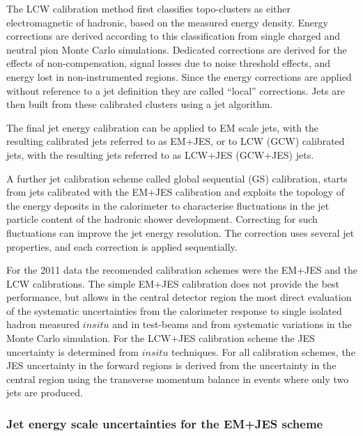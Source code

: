 \begin{itemize}
The LCW calibration method first classifies topo-clusters as either electromagnetic of hadronic, based on the measured energy density. Energy corrections are derived according to this classification from single charged and neutral pion Monte Carlo simulations. Dedicated corrections are derived for the effects of non-compensation, signal losses due to noise threshold effects, and energy lost in non-instrumented regions. Since the energy corrections are applied without reference to a jet definition they are called ``local'' corrections. Jets are then built from these calibrated clusters using a jet algorithm.  

The final jet energy calibration can be applied to EM scale jets, with the resulting calibrated jets referred to as EM+JES, or to LCW (GCW) calibrated jets, with the resulting jets referred to as LCW+JES (GCW+JES) jets.

A further jet calibration scheme called global sequential (GS) calibration, starts from jets calibrated with the EM+JES calibration and exploits the topology of the energy deposits in the calorimeter to characterise fluctuations in the jet particle content of the hadronic shower development.  Correcting for such fluctuations can improve the jet energy resolution. The correction uses several jet properties, and each correction is applied sequentially.


For the 2011 data the recomended calibration schemes were the EM+JES and the LCW calibrations. The simple EM+JES calibration does not provide the best performance, but allows in the central detector region the most direct evaluation of the systematic uncertainties from the calorimeter response to single isolated hadron measured $in situ$ and in test-beams and from systematic variations in the Monte Carlo simulation.  For the LCW+JES calibration scheme the JES uncertainty is determined from $in situ$ techniques. For all calibration schemes, the JES uncertainty in the forward regions is derived from the uncertainty in the central region using the transverse momentum balance in events where only two jets are produced. 



\subsubsection{Jet energy scale uncertainties for the EM+JES scheme}


\end{itemize}
